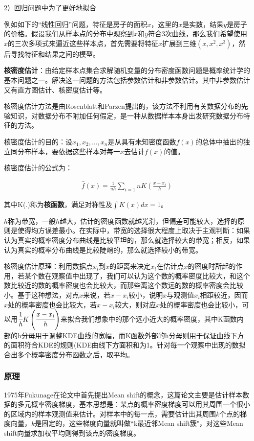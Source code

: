 \documentclass[12pt]{article}
\begin{document}
2）回归问题中为了更好地拟合

例如如下的“线性回归”问题，特征是房子的面积$x$，这里的$x$是实数，结果$y$是房子的价格。假设我们从样本点的分布中观察到$x$和$y$符合$3$次曲线，那么我们希望使用$x$的三次多项式来逼近这些样本点，首先需要将特征$x$扩展到三维$(x, x^2, x^3)$，然后寻找特征和结果之间的模型。

\textbf{核密度估计}：由给定样本点集合求解随机变量的分布密度函数问题是概率统计学的基本问题之一。解决这一问题的方法包括参数估计和非参数估计。其中非参数估计又有直方图估计、核密度估计等。

核密度估计方法是由Rosenblatt\cite{}和Parzen\cite{}提出的，该方法不利用有关数据分布的先验知识，对数据分布不附加任何假定，是一种从数据样本本身出发研究数据分布特征的方法。

核密度估计的目的：设$x_1, x_2, \ldots, x_n$是从具有未知密度函数$f(x)$的总体中抽出的独立同分布样本，要依据这些样本对每一$x$去估计$f(x)$的值。

核密度估计的公式为：

\begin{align}
\hat{f}(x) = \frac{1}{nh}\sum_{i=1}{n}K(\frac{x-x_i}{h})
\end{align}

其中K(.)称为\textbf{核函数}，满足对称性及$\int K(x)dx=1$。

$h$称为带宽，一般$h$越大，估计的密度函数就越光滑，但偏差可能较大，选择的原则是使得均方误差最小。在实际中，带宽的选择很大程度上取决于主观判断：如果认为真实的概率密度分布曲线是比较平坦的，那么就选择较大的带宽；相反，如果认为真实的概率分布曲线是比较陡峭的，那么就选择较小的带宽。

核密度估计原理：利用数据点$x_i$到$x$的距离来决定$x_i$在估计点$x$的密度时所起的作用，若某个数在观察值中出现了，我们可以认为这个数的概率密度比较大，和这个数比较近的数的概率密度也会比较大，而那些离这个数远的数的概率密度会比较小。基于这种想法，对点$x$来说，若$x-x_i$较小，说明$x$与观测值$x_i$相距较近，因而$x$处的概率密度也会比较大，若$x-x_i$较大，则对应$x$处的概率密度也会比较小，可以用$\cfrac{1}{h}K\left(\cfrac{x-x_i}{h}\right)$来拟合我们想象中的那个远小近大的概率密度，其中K函数内部的h分母用于调整KDE曲线的宽幅，而K函数外部的h分母则用于保证曲线下方的面积符合KDE的规则(KDE曲线下方面积和为1。针对每一个观察中出现的数拟合出多个概率密度分布函数之后，取平均。

\subsubsection{原理}

1975年Fukunage在论文\cite{fukunaga1975estimation}中首先提出Mean shift的概念，这篇论文主要是估计样本数据的多元概率密度梯度，基本思想是：某点的概率密度梯度可以用其周围一个很小的区域内的样本观测值来估计。对样本中的每一点，需要估计出其周围$k$个点的梯度向量，$k$是固定的，这些梯度向量就叫做“k最近邻Mean shift簇"，对这些Mean shift向量求加权平均则得到该点的密度梯度。
\end{document}
